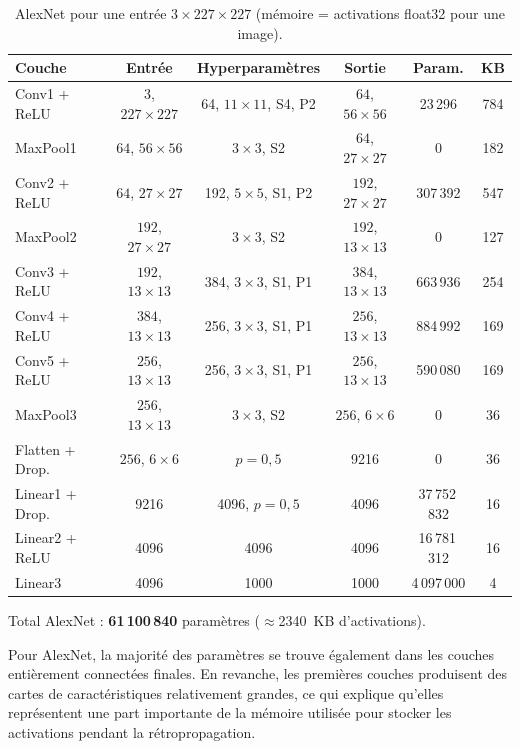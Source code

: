 \documentclass[11pt,a4paper]{article}
\begin{document}
\begin{table}[H]
\centering
\caption{AlexNet pour une entrée $3\times227\times227$
(mémoire = activations float32 pour une image).}
\scriptsize
\setlength{\tabcolsep}{3pt}
\begin{tabular}{@{}lccccc@{}}
\toprule
Couche & Entrée & Hyperparamètres & Sortie & Param. & KB \\
\midrule
Conv1 + ReLU & $3$, $227{\times}227$ & 64, $11{\times}11$, S4, P2 & $64$, $56{\times}56$ & 23\,296 & 784 \\
MaxPool1 & $64$, $56{\times}56$ & $3{\times}3$, S2 & $64$, $27{\times}27$ & 0 & 182 \\
Conv2 + ReLU & $64$, $27{\times}27$ & 192, $5{\times}5$, S1, P2 & $192$, $27{\times}27$ & 307\,392 & 547 \\
MaxPool2 & $192$, $27{\times}27$ & $3{\times}3$, S2 & $192$, $13{\times}13$ & 0 & 127 \\
Conv3 + ReLU & $192$, $13{\times}13$ & 384, $3{\times}3$, S1, P1 & $384$, $13{\times}13$ & 663\,936 & 254 \\
Conv4 + ReLU & $384$, $13{\times}13$ & 256, $3{\times}3$, S1, P1 & $256$, $13{\times}13$ & 884\,992 & 169 \\
Conv5 + ReLU & $256$, $13{\times}13$ & 256, $3{\times}3$, S1, P1 & $256$, $13{\times}13$ & 590\,080 & 169 \\
MaxPool3 & $256$, $13{\times}13$ & $3{\times}3$, S2 & $256$, $6{\times}6$ & 0 & 36 \\
Flatten + Drop. & $256$, $6{\times}6$ & $p=0{,}5$ & 9216 & 0 & 36 \\
Linear1 + Drop. & 9216 & 4096, $p=0{,}5$ & 4096 & 37\,752\,832 & 16 \\
Linear2 + ReLU & 4096 & 4096 & 4096 & 16\,781\,312 & 16 \\
Linear3 & 4096 & 1000 & 1000 & 4\,097\,000 & 4 \\
\bottomrule
\end{tabular}
\end{table}

Total AlexNet : \textbf{61\,100\,840} paramètres ($\approx$2340~KB d'activations).

Pour AlexNet, la majorité des paramètres se trouve également dans les couches
entièrement connectées finales. En revanche, les premières couches produisent des
cartes de caractéristiques relativement grandes, ce qui explique qu'elles
représentent une part importante de la mémoire utilisée pour stocker les activations
pendant la rétropropagation.
\end{document}
